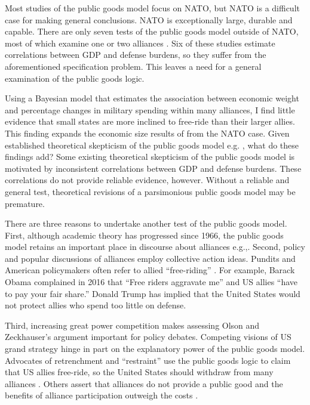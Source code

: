 \documentclass[12pt]{article}
\begin{document}
Most studies of the public goods model focus on NATO, but NATO is a difficult case for making general conclusions. 
NATO is exceptionally large, durable and capable. 
There are only seven tests of the public goods model outside of NATO, most of which examine one or two alliances \citep{Russett1970, Starr1974, Reisinger1983, Thies1987, ConybeareSandler1990, OnealWhatley1996, Siroky2012}. 
Six of these studies estimate correlations between GDP and defense burdens, so they suffer from the aforementioned specification problem.
This leaves a need for a general examination of the public goods logic. 


Using a Bayesian model that estimates the association between economic weight and percentage changes in military spending within many alliances, I find little evidence that small states are more inclined to free-ride than their larger allies.
This finding expands the economic size results of \citep{PluemperNeumayer2015} from the NATO case.
Given established theoretical skepticism of the public goods model e.g. \citep{Palmer1990, GatesTerasawa1992, SandlerHartley2001, Norrlof2010, NiouZeigler2019}, what do these findings add? 
Some existing theoretical skepticism of the public goods model is motivated by inconsistent correlations between GDP and defense burdens. 
These correlations do not provide reliable evidence, however. 
Without a reliable and general test, theoretical revisions of a parsimonious public goods model may be premature.


There are three reasons to undertake another test of the public goods model. 
First, although academic theory has progressed since 1966, the public goods model retains an important place in discourse about alliances e.g.,\citep{Walt1990, Sandler1993, Mearsheimer1994, Goldstein1995, SandlerHartley2001, Garfinkel2004, Walt2009, Norrlof2010, Barrett2010, PluemperNeumayer2015}.
Second, policy and popular discussions of alliances employ collective action ideas.
Pundits and American policymakers often refer to allied ``free-riding'' \citep{Lanoszka2015}.   
For example, Barack Obama complained in 2016 that ``Free riders aggravate me'' and US allies ``have to pay your fair share.'' 
Donald Trump has implied that the United States would not protect allies who spend too little on defense. 


Third, increasing great power competition makes assessing Olson and Zeckhauser's argument important for policy debates. 
Competing visions of US grand strategy hinge in part on the explanatory power of the public goods model. 
Advocates of retrenchment and ``restraint'' use the public goods logic to claim that US allies free-ride, so the United States should withdraw from many alliances \citep{Preble2009, Posen2014}. 
Others assert that alliances do not provide a public good and the benefits of alliance participation outweigh the costs \citep{Brooksetal2013, BrandsFeaver2017}. 
\end{document}
